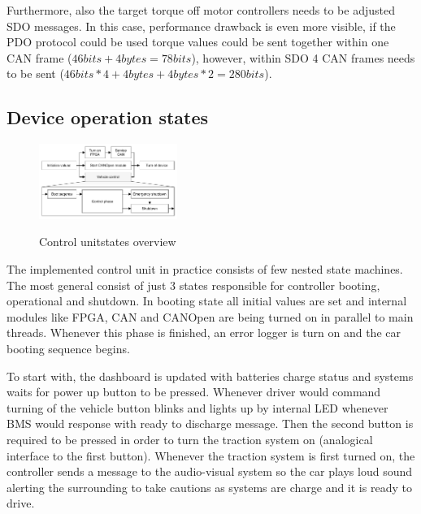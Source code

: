 Furthermore, also the target torque off motor controllers needs to be adjusted SDO messages. In this case, performance drawback is even more visible, if the PDO protocol could be used torque values could be sent together within one CAN frame ($46bits+4bytes=78 bits$), however, within SDO 4 CAN frames needs to be sent ($46bits*4+4bytes+4bytes*2=280bits$).

\subsection{Device operation states}

\begin{figure}
    \vspace{-20pt}
    \centering
        \includegraphics[width=0.4\textwidth]{figures/System_overview}
        \label{fig:sys_over}
        \caption{Control unit\newline states overview}
    \vspace{-20pt}
\end{figure}

The implemented control unit in practice consists of few nested state machines. The most general consist of just 3 states responsible for controller booting, operational and shutdown.
In booting state all initial values are set and internal modules like FPGA, CAN and CANOpen are being turned on in parallel to main threads. Whenever this phase is finished, an error logger is turn on and the car booting sequence begins.

To start with, the dashboard is updated with batteries charge status and systems waits for power up button to be pressed. Whenever driver would command turning of the vehicle button blinks and lights up by internal LED whenever BMS would response with ready to discharge message. Then the second button is required to be pressed in order to turn the traction system on (analogical interface to the first button). Whenever the traction system is first turned on, the controller sends a message to the audio-visual system so the car plays loud sound alerting the surrounding to take cautions as systems are charge and it is ready to drive.

